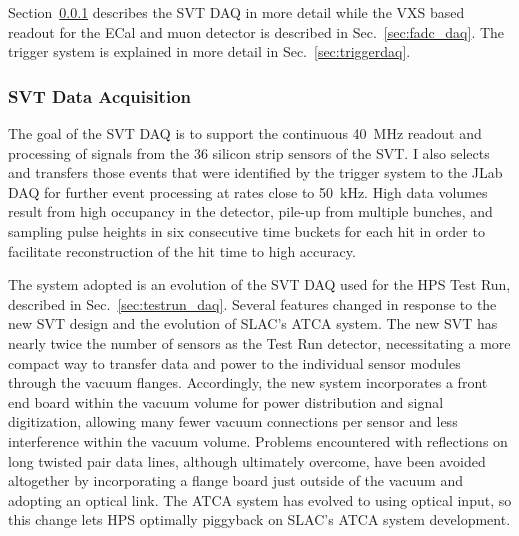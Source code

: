 Section~\ref{sec:svt_daq} describes the SVT DAQ in more detail while the VXS based readout for 
the ECal and muon detector is described in Sec.~\ref{sec:fadc_daq}. The trigger 
system is explained in more detail in Sec.~\ref{sec:triggerdaq}.

\subsubsection{SVT Data Acquisition}
\label{sec:svt_daq}
The goal of the SVT DAQ is to support the continuous 40~MHz readout and processing of signals from 
the 36 silicon strip sensors of the SVT. I also selects and transfers those events that were identified by the 
trigger system to the JLab DAQ for further event processing at rates 
close to 50~kHz. High data volumes result from high occupancy in the detector, pile-up from multiple bunches,
and sampling pulse heights in six consecutive time buckets for each hit in order to facilitate 
reconstruction of the hit time to high accuracy.

The system adopted is an evolution of the SVT DAQ used for the HPS Test Run, described in 
Sec.~\ref{sec:testrun_daq}. Several features changed in
response to the new SVT design and the evolution of SLAC's ATCA system. The new SVT has nearly twice 
the number of sensors as the Test Run detector, 
necessitating a more compact way to transfer data and power to the individual sensor modules through the
vacuum flanges. Accordingly, the new system incorporates a front end board within the vacuum volume for 
power distribution and signal digitization,
allowing many fewer vacuum connections per sensor and less interference within the vacuum volume. 
Problems encountered with reflections on long twisted pair
data lines, although ultimately overcome, have been avoided altogether by incorporating a flange board just 
outside of the vacuum and adopting an optical link. The ATCA system has evolved to using optical input, so 
this change lets HPS optimally piggyback on SLAC's ATCA system development.  

